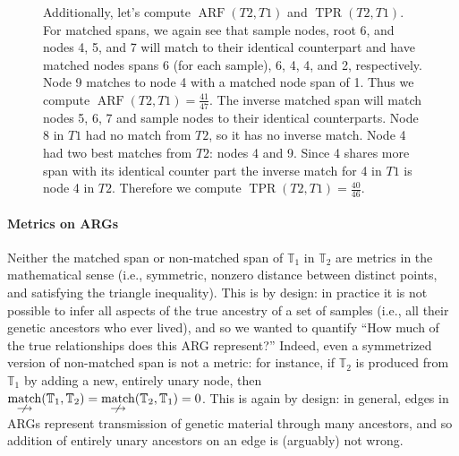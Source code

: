 \documentclass[10pt,twoside,lineno]{gsajnl}
\newcommand{\T}{\mathbb{T}}
\newcommand{\nmatch}{\underset{\centernot\longrightarrow}{\operatorname{match}}}
\begin{document}
\begin{figure}[!ht]
\begin{center}
{        Additionally, let's compute $\operatorname{ARF}(T2,T1)$ and $\operatorname{TPR}(T2,T1)$.
        For matched spans, we again see that sample nodes, root 6, and nodes 4, 5, and 7 will match to their identical counterpart
        and have matched nodes spans 6 (for each sample), 6, 4, 4, and 2, respectively.
        Node 9 matches to node 4 with a matched node span of 1. Thus we compute $\operatorname{ARF}(T2,T1)=\frac{41}{47}$. 
        The inverse matched span will match nodes 5, 6, 7 and sample nodes to their identical counterparts. 
        Node 8 in $T1$ had no match from $T2$, so it has no inverse match. Node 4 had two best matches from $T2$: nodes 4 and 9.
        Since 4 shares more span with its identical counter part the inverse match for 4 in $T1$ is node 4 in $T2$. Therefore we compute 
        $\operatorname{TPR}(T2,T1)=\frac{40}{46}$. 
        \label{fig:conceptual_discrepancy}
    }
	\end{center}
\end{figure}


\paragraph{Metrics on ARGs} 
Neither the matched span or non-matched span of $\T_1$ in $\T_2$ are metrics in the mathematical sense
(i.e., symmetric, nonzero distance between distinct points, and satisfying the triangle inequality).
This is by design: in practice it is not possible to infer all aspects
of the true ancestry of a set of samples (i.e., all their genetic ancestors who ever lived),
and so we wanted to quantify
``How much of the true relationships does this ARG represent?''
Indeed, even a symmetrized version of non-matched span is not a metric:
for instance, if $\T_2$ is produced from $\T_1$ by adding a new, entirely unary node,
then $\nmatch(\T_1,\T_2) = \nmatch(\T_2,\T_1) = 0$.
This is again by design: in general, edges in ARGs represent transmission of genetic material
through many ancestors, and so addition of entirely unary ancestors on an edge
is (arguably) not wrong.
\end{document}

